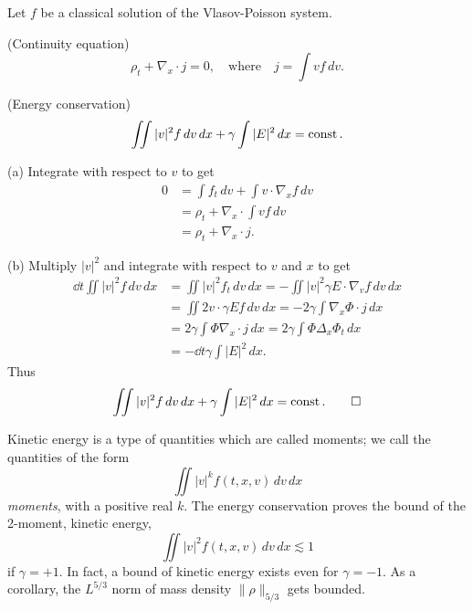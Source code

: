 \documentclass{article}
\begin{document}
\begin{lem}
Let $f$ be a classical solution of the Vlasov-Poisson system.
\begin{parts}
\item(Continuity equation)
\[\rho_t+\nabla_x\cdot j=0,\quad\text{where}\quad j=\int vf\,dv.\]
\item(Energy conservation)
\[\iint|v|^2f\,dv\,dx+\gamma\int|E|^2\,dx=\operatorname{const}.\]
\end{parts}
\end{lem}
\begin{pf}
(a)
Integrate with respect to $v$ to get
\begin{align*}
0&=\int f_t\,dv+\int v\cdot\nabla_xf\,dv\\
&=\rho_t+\nabla_x\cdot\int vf\,dv\\
&=\rho_t+\nabla_x\cdot j.
\end{align*}

(b)
Multiply $|v|^2$ and integrate with respect to $v$ and $x$ to get
\begin{align*}
\dd{t}\iint|v|^2f\,dv\,dx
&=\iint|v|^2f_t\,dv\,dx=-\iint|v|^2\gamma E\cdot\nabla_vf\,dv\,dx\\
&=\iint2v\cdot\gamma Ef\,dv\,dx=-2\gamma\int\nabla_x\Phi\cdot j\,dx\\
&=2\gamma\int\Phi\nabla_x\cdot j\,dx=2\gamma\int\Phi\Delta_x\Phi_t\,dx\\
&=-\dd{t}\gamma\int|E|^2\,dx.
\end{align*}
Thus
\[\iint|v|^2f\,dv\,dx+\gamma\int|E|^2\,dx=\operatorname{const}.\qedhere\]
\end{pf}

Kinetic energy is a type of quantities which are called moments;
we call the quantities of the form
\[\iint|v|^kf(t,x,v)\,dv\,dx\]
\emph{moments}, with a positive real $k$.
The energy conservation proves the bound of the 2-moment, kinetic energy,
\[\iint|v|^2f(t,x,v)\,dv\,dx\lesssim1\]
if $\gamma=+1$.
In fact, a bound of kinetic energy exists even for $\gamma=-1$.
As a corollary, the $L^{5/3}$ norm of mass density $\|\rho\|_{5/3}$ gets bounded.
\end{document}

